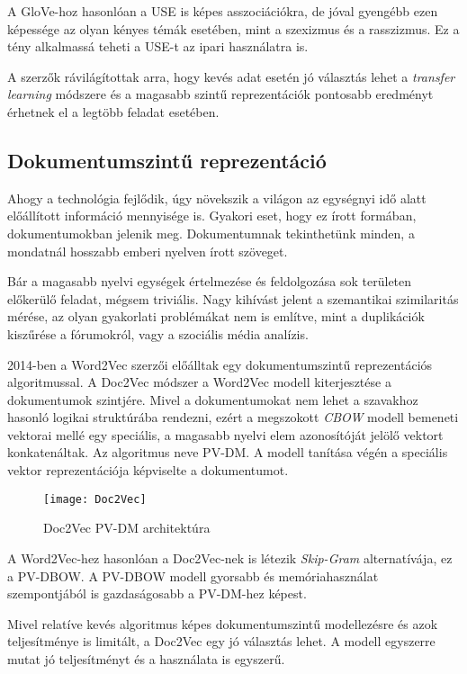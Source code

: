 A GloVe-hoz hasonlóan a USE is képes asszociációkra, de jóval gyengébb ezen képessége az olyan kényes témák esetében, mint a szexizmus és a rasszizmus. Ez a tény alkalmassá teheti a USE-t az ipari használatra is.

A szerzők rávilágítottak arra, hogy kevés adat esetén jó választás lehet a \textit{transfer learning} módszere és a magasabb szintű reprezentációk pontosabb eredményt érhetnek el a legtöbb feladat esetében.

\subsection{Dokumentumszintű reprezentáció}
Ahogy a technológia fejlődik, úgy növekszik a világon az egységnyi idő alatt előállított információ mennyisége is. Gyakori eset, hogy ez írott formában, dokumentumokban jelenik meg. Dokumentumnak tekinthetünk minden, a mondatnál hosszabb emberi nyelven írott szöveget.

Bár a magasabb nyelvi egységek értelmezése és feldolgozása sok területen előkerülő feladat, mégsem triviális. Nagy kihívást jelent a szemantikai szimilaritás mérése, az olyan gyakorlati problémákat nem is említve, mint a duplikációk kiszűrése a fórumokról, vagy a szociális média analízis.

2014-ben a Word2Vec szerzői előálltak egy dokumentumszintű reprezentációs algoritmussal. A Doc2Vec \cite{le2014distributed} módszer a Word2Vec modell kiterjesztése a dokumentumok szintjére. Mivel a dokumentumokat nem lehet a szavakhoz hasonló logikai struktúrába rendezni, ezért a megszokott \textit{CBOW} modell bemeneti vektorai mellé egy speciális, a magasabb nyelvi elem azonosítóját jelölő vektort konkatenáltak. Az algoritmus neve PV-DM. A modell tanítása végén a speciális vektor reprezentációja képviselte a dokumentumot.

\begin{figure}[H]
	\centering
	\texttt{[image: Doc2Vec]}
	\caption{Doc2Vec PV-DM architektúra}
\end{figure}

A Word2Vec-hez hasonlóan a Doc2Vec-nek is létezik \textit{Skip-Gram} alternatívája, ez a PV-DBOW. A PV-DBOW modell gyorsabb és memóriahasználat szempontjából is gazdaságosabb a PV-DM-hez képest.

Mivel relatíve kevés algoritmus képes dokumentumszintű modellezésre és azok teljesítménye is limitált, a Doc2Vec egy jó választás lehet. A modell egyszerre mutat jó teljesítményt és a használata is egyszerű.

